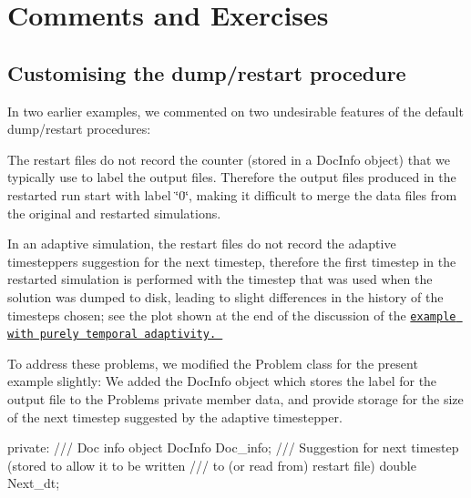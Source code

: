 \hypertarget{index_comments}{}\section{Comments and Exercises}\label{index_comments}
\hypertarget{index_cust}{}\subsection{Customising the dump/restart procedure}\label{index_cust}
In two earlier examples, we commented on two undesirable features of the default dump/restart procedures\+:
\begin{DoxyItemize}
\item The restart files do not record the counter (stored in a {\ttfamily Doc\+Info} object) that we typically use to label the output files. Therefore the output files produced in the restarted run start with label \char`\"{}0\char`\"{}, making it difficult to merge the data files from the original and restarted simulations.
\item In an adaptive simulation, the restart files do not record the adaptive timestepper\textquotesingle{}s suggestion for the next timestep, therefore the first timestep in the restarted simulation is performed with the timestep that was used when the solution was dumped to disk, leading to slight differences in the history of the timesteps chosen; see the plot shown at the end of the discussion of the \href{../../two_d_unsteady_heat_t_adapt/html/index.html}{\tt example with purely temporal adaptivity. }
\end{DoxyItemize}To address these problems, we modified the {\ttfamily Problem} class for the present example slightly\+: We added the {\ttfamily Doc\+Info} object which stores the label for the output file to the {\ttfamily Problem\textquotesingle{}s} private member data, and provide storage for the size of the next timestep suggested by the adaptive timestepper.

 
\begin{DoxyCodeInclude}
\textcolor{keyword}{private}:
\textcolor{comment}{}
\textcolor{comment}{ /// Doc info object}
\textcolor{comment}{} DocInfo Doc\_info;
\textcolor{comment}{}
\textcolor{comment}{ /// Suggestion for next timestep (stored to allow it to be written}
\textcolor{comment}{ /// to (or read from) restart file)}
\textcolor{comment}{} \textcolor{keywordtype}{double} Next\_dt;

\end{DoxyCodeInclude}


